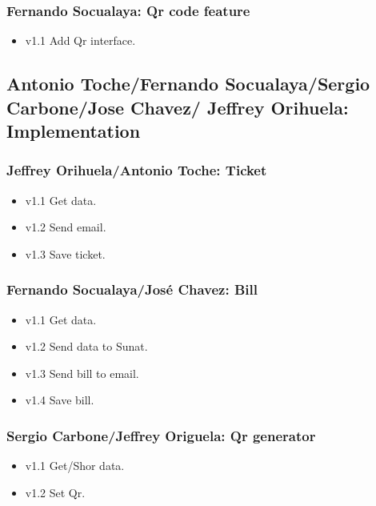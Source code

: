 \documentclass{article}
\begin{document}
\subsubsection{Fernando Socualaya: Qr code feature}
\begin{itemize}
\item v1.1 Add Qr interface.
\end{itemize}

 \subsection{Antonio Toche/Fernando Socualaya/Sergio Carbone/Jose Chavez/ Jeffrey Orihuela: Implementation}
 \blindtext
\subsubsection{Jeffrey Orihuela/Antonio Toche: Ticket}
\begin{itemize}
\item v1.1 Get data.
\item v1.2 Send email.
\item v1.3 Save ticket.
\end{itemize}


\subsubsection{Fernando Socualaya/José Chavez: Bill}
\begin{itemize}
\item v1.1 Get data.
\item v1.2 Send data to Sunat.
\item v1.3 Send bill to email.
\item v1.4 Save bill.
\end{itemize}

\subsubsection{Sergio Carbone/Jeffrey Origuela: Qr generator}
\begin{itemize}
\item v1.1 Get/Shor data.
\item v1.2 Set Qr.
\end{itemize}
\end{document}
